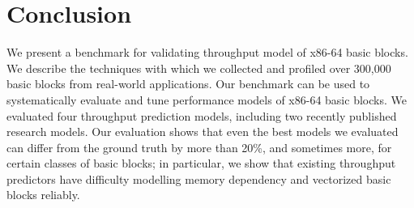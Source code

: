 \section{Conclusion}
We present a benchmark for validating throughput model of x86-64 basic blocks.
We describe the techniques with which we collected
and profiled over 300,000 basic blocks from real-world applications.
Our benchmark can be used to systematically evaluate and tune performance models
of x86-64 basic blocks.
We evaluated four throughput prediction models, including two recently
published research models.
Our evaluation shows that even the best models we evaluated can differ from
the ground truth by more than 20\%, and sometimes more, 
for certain classes of basic blocks;
in particular, we show that existing throughput predictors have difficulty 
modelling memory dependency and vectorized basic blocks reliably.